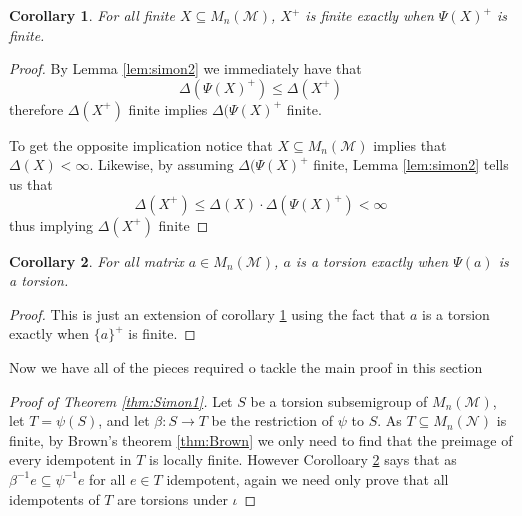 \documentclass[12pt,a4paper]{amsart}
\newcommand{\TM}{\mathcal{M}}
\newcommand{\TN}{\mathcal{N}}
\newtheorem{cor}{Corollary}[thm]
\theoremstyle{definition}
\theoremstyle{remark}
\begin{document}
\begin{cor}\label{cor:simon1}
For all finite $X\subseteq M_n(\TM)$, $X^+$ is finite exactly when $\Psi(X)^+$ is finite.
\end{cor}
\begin{proof}
By Lemma \ref{lem:simon2} we immediately have that
\begin{equation*}
    \Delta(\Psi(X)^+)\leq\Delta(X^+)
\end{equation*}
therefore $\Delta(X^+)$ finite implies $\Delta(\Psi(X)^+$ finite.

To get the opposite implication notice that $X\subseteq M_n(\TM)$ implies that $\Delta(X)<\infty$. Likewise, by assuming $\Delta(\Psi(X)^+$ finite,  Lemma \ref{lem:simon2} tells us that
\begin{equation*}
    \Delta(X^+)\leq\Delta(X)\cdot\Delta(\Psi(X)^+)<\infty
\end{equation*}
thus implying $\Delta(X^+)$ finite
\end{proof}

\begin{cor}\label{cor:simon2}
For all matrix $a\in M_n(\TM)$, $a$ is a torsion exactly when $\Psi(a)$ is a torsion.
\end{cor}
\begin{proof}
This is just an extension of corollary \ref{cor:simon1} using the fact that $a$ is a torsion exactly when $\{a\}^+$ is finite.
\end{proof}

Now we have all of the pieces required o tackle the main proof in this section

\begin{proof}[Proof of Theorem \ref{thm:Simon1}]
Let $S$ be a torsion subsemigroup of $M_n(\TM)$, let $T=\psi(S)$, and let $\beta:S\to T$ be the restriction of $\psi$ to $S$. As $T\subseteq M_n(\TN)$ is finite, by Brown's theorem \eqref{thm:Brown} we only need to find that the preimage of every idempotent in $T$ is locally finite. However Corolloary \ref{cor:simon2} says that as $\beta^{-1}e\subseteq\psi^{-1}e$ for all $e\in T$ idempotent, again we need only prove that all idempotents of $T$ are torsions under $\iota$
\end{proof}

\end{document}
